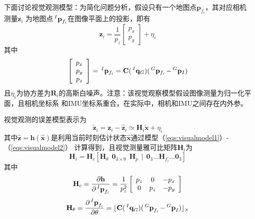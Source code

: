 \documentclass{article}
\begin{document}
\par
下面讨论视觉观测模型：为简化问题分析，假设只有一个地图点$\textbf{p}_{f_i}$，其对应相机测量$\textbf{z}_i$
为地图点$\sideset{^I}{}{\mathop{\textbf{p}_{f_i}}}$在图像平面上的投影，即有
\begin{equation}\label{eqs:visualmodel1}
    \textbf{z}_{i}=\frac{1}{p_z}\left[\begin{array}{c} p_x\\p_y\end{array}\right]+\eta_i
\end{equation}
其中
\begin{equation}\label{eqs:visualmodel2}
    \left[\begin{array}{c} p_x\\p_y\\p_z \end{array}\right]
        =\sideset{^I}{}{\mathop{\mathbf{p}_{f_i}}}
        =\textbf{C}(\sideset{^I}{}{\mathop{\mathbf{q}_{G}}})
        (\sideset{^G}{}{\mathop{\mathbf{p}_{f_i}}}-\sideset{^G}{}{\mathop{\mathbf{p}_I}})
\end{equation}
且$\eta_i$为协方差为$\textbf{R}_i$的高斯白噪声。注意：该视觉观察模型假设图像测量为归一化平面，且相机坐标系
和IMU坐标系重合，在实际中，相机和IMU之间存在内外参。
\par
视觉观测的误差模型表示为
\begin{equation}
    \tilde{\mathbf{z}}_{i}=\textbf{z}_{i}-\hat{\mathbf{z}}_{i} \simeq \textbf{H}_{i}\tilde{\textbf{x}}+\eta_{i}
\end{equation}
其中$\hat{\textbf{z}}=\textbf{h}(\hat{\textbf{x}})$是利用当前时刻估计状态$\hat{\textbf{x}}$通过模型（\ref{eqs:visualmodel1}）-（\ref{eqs:visualmodel2}）
计算得到，且视觉测量雅可比矩阵$\textbf{H}_{i}$为
\begin{equation}
    \textbf{H}_{i}=\textbf{H}_{c}
    \left[\textbf{H}_{\theta}\ \ \textbf{0}_{3\times 9}\ \ \textbf{H}_{p}\ \ |\ \ 
    \textbf{0}_{3}\dots\textbf{H}_{f_i}\dots\textbf{0}_{3}\right]
\end{equation}
其中
\begin{equation}
    \textbf{H}_{c}=\frac{\partial\textbf{h}}{\partial\sideset{^I}{}{\mathop{\textbf{p}_{f_i}}}}
    =\frac{1}{p_{z}^{2}}\left[\begin{array}{ccc}
    p_z &0 &-p_x\\
    0 &p_z &-p_y
    \end{array}\right]
\end{equation}
\begin{equation}
    \textbf{H}_{\theta}=\frac{\partial\sideset{^I}{}{\mathop{\textbf{p}_{f_i}}}}{\partial{\theta}}
    =\lfloor\textbf{C}(\sideset{^I}{}{\mathop{\textbf{q}_{G}}})
    (\sideset{^G}{}{\mathop{\textbf{p}_{f_i}}}-\sideset{^G}{}{\mathop{\textbf{p}_I}}) \rfloor_{\times}
\end{equation}
\end{document}
